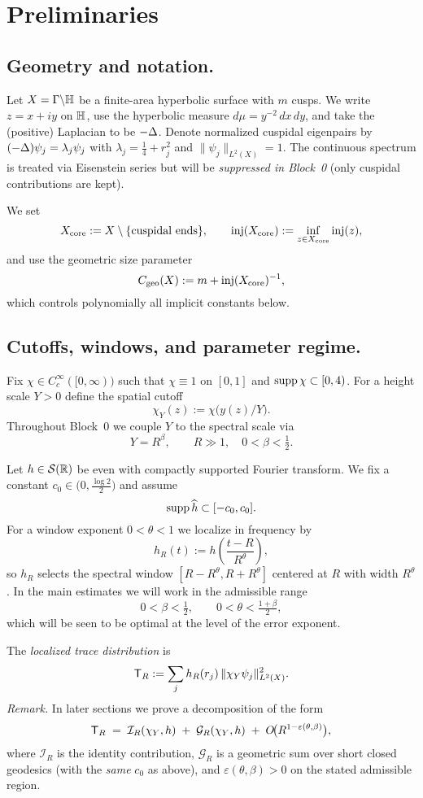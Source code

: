 \section{Preliminaries}\label{sec:prelim}

\subsection{Geometry and notation.}
Let $X=\Gamma\backslash\mathbb{H}$ be a finite-area hyperbolic surface with $m$ cusps.
We write $z=x+iy$ on $\mathbb{H}$, use the hyperbolic measure $d\mu=y^{-2}\,dx\,dy$, and take the (positive) Laplacian to be $-\Delta$.
Denote normalized cuspidal eigenpairs by $(-\Delta)\psi_j=\lambda_j\psi_j$ with $\lambda_j=\tfrac14+r_j^2$ and $\|\psi_j\|_{L^2(X)}=1$.
The continuous spectrum is treated via Eisenstein series but will be \emph{suppressed in Block~0} (only cuspidal contributions are kept).

We set
\[
X_{\mathrm{core}}:=X\setminus\{\text{cuspidal ends}\},\qquad
\mathrm{inj}(X_{\mathrm{core}}):=\inf_{z\in X_{\mathrm{core}}}\mathrm{inj}(z),
\]
and use the geometric size parameter
\[
C_{\mathrm{geo}}(X):=m+\mathrm{inj}(X_{\mathrm{core}})^{-1},
\]
which controls polynomially all implicit constants below.

\subsection{Cutoffs, windows, and parameter regime.}
Fix $\chi\in C_c^\infty([0,\infty))$ such that $\chi\equiv1$ on $[0,1]$ and $\operatorname{supp}\chi\subset[0,4)$.
For a height scale $Y>0$ define the spatial cutoff
\[
\chi_Y(z):=\chi\!\big(y(z)/Y\big).
\]
Throughout Block~0 we couple $Y$ to the spectral scale via
\[
Y=R^\beta,\qquad R\gg1,\quad 0<\beta<\tfrac12.
\]

Let $h\in\mathcal{S}(\mathbb{R})$ be even with compactly supported Fourier transform.
We fix a constant $c_0\in\big(0,\tfrac{\log 2}{2}\big)$ and assume
\[
\operatorname{supp} \widehat{h}\subset[-c_0,c_0].
\]
For a window exponent $0<\theta<1$ we localize in frequency by
\[
h_R(t):=h\!\left(\frac{t-R}{R^\theta}\right),
\]
so $h_R$ selects the spectral window $[R-R^\theta,R+R^\theta]$ centered at $R$ with width $R^\theta$.
In the main estimates we will work in the admissible range
\[
0<\beta<\tfrac12,\qquad 0<\theta<\tfrac{1+\beta}{2},
\]
which will be seen to be optimal at the level of the error exponent.

\begin{definition}\label{def:TR}
The \emph{localized trace distribution} is
\[
  \mathsf{T}_R := \sum_j h_R(r_j)\,\|\chi_Y\psi_j\|_{L^2(X)}^2.
\]
\emph{Remark.} In later sections we prove a decomposition of the form
\[
\mathsf{T}_R \;=\; \mathcal{I}_R(\chi_Y,h)\;+\;\mathcal{G}_R(\chi_Y,h)\;+\;O\!\big(R^{1-\varepsilon(\theta,\beta)}\big),
\]
where $\mathcal{I}_R$ is the identity contribution, $\mathcal{G}_R$ is a geometric sum over short closed geodesics (with the \emph{same} $c_0$ as above), and $\varepsilon(\theta,\beta)>0$ on the stated admissible region.
\end{definition}

